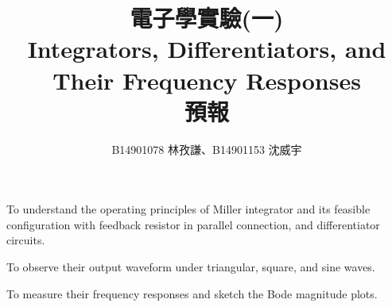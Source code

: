 \documentclass[a4paper,12pt]{article}
\begin{document}
\title{電子學實驗(一)\\Integrators, Differentiators, and Their Frequency Responses\\預報}
\author{B14901078 林孜謙、B14901153 沈威宇}
\date{}
\titledoc
{}
\bit
\item To understand the operating principles of Miller integrator and its feasible configuration with feedback resistor in parallel connection, and differentiator circuits.
\item To observe their output waveform under triangular, square, and sine waves.
\item To measure their frequency responses and sketch the Bode magnitude plots.
\eit
{}

\end{document}
